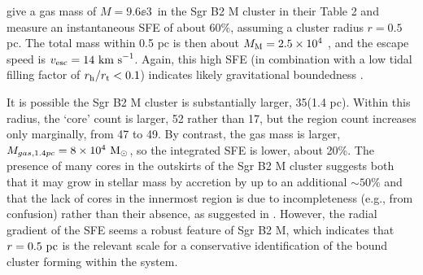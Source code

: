\documentclass[twocolumn]{aastex62}
\begin{document}
% 


\citet{Schmiedeke2016a} give a gas mass of $M=9.6\ee{3}$~\msun in the Sgr B2 M
cluster in their Table 2 and measure an instantaneous SFE of about 60\%, assuming
a cluster radius $r=0.5$ pc.  The total mass within 0.5 pc is then about $M_{\rm M} =
2.5\times10^{4}$ \msun, and the escape speed is $v_{\rm esc}=14~\textrm{km~s}^{-1}$. Again, this high SFE (in combination with a low tidal filling factor of $r_{\rm h}/r_{\rm t}<0.1$) indicates likely gravitational boundedness \citep[e.g.][]{Baumgardt2007a,Kruijssen2012b}.



It is possible the Sgr B2 M cluster is substantially larger, 35\arcsec (1.4 pc).
Within this radius, the `core' count is larger, 52 rather than 17, but the \hii
region count increases only marginally, from 47 to 49.  By contrast,
the gas mass is larger, $M_{gas,1.4pc} = 8\times10^{4}~\mathrm{M}_{\odot}$, so the integrated SFE is lower,
about 20\%.  
The presence of many cores in the outskirts of the Sgr B2 M cluster suggests
both that it may grow in stellar mass by accretion by up to an additional
$\sim50\%$ and that the lack of cores in the innermost region is due to
incompleteness (e.g., from confusion) rather than their absence, as suggested
in \citet{Ginsburg2018a}. However, the radial gradient of the SFE seems a robust feature of Sgr B2 M, which indicates that $r=0.5~\mathrm{pc}$ is the relevant scale for a conservative identification of the bound cluster forming within the system.
\end{document}
